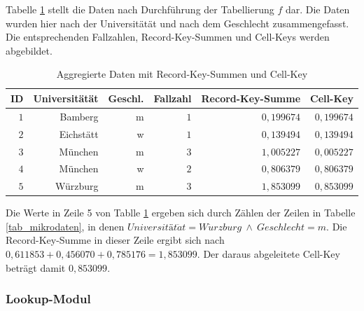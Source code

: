 Tabelle \ref{tab_agg} stellt die Daten nach Durchführung der Tabellierung $f$ dar. Die Daten wurden hier nach der Universitätät und nach dem Geschlecht zusammengefasst. Die entsprechenden Fallzahlen, Record-Key-Summen und Cell-Keys werden abgebildet. 

\begin{table}[h]
    \centering
    \begin{tabular}{ r r r r r r}
        \textbf{ID} \vline & \textbf{Universitätät} & \textbf{Geschl.} & \textbf{Fallzahl} & \textbf{Record-Key-Summe} & \textbf{Cell-Key} \\ 
        \hline
        $1$ \vline & Bamberg & m & $1$ & $0,199674$ & $0,199674$ \\
        $2$ \vline & Eichstätt & w & $1$ & $0,139494$ & $0,139494$ \\
        $3$ \vline & München & m & $3$ & $1,005227$ & $0,005227$ \\
        $4$ \vline & München & w & $2$ & $0,806379$ & $0,806379$ \\
        $5$ \vline & Würzburg & m & $3$ & $1,853099$ & $0,853099$
    \end{tabular}
    \caption{Aggregierte Daten mit Record-Key-Summen und Cell-Key}
    \label{tab_agg}
\end{table}

Die Werte in Zeile 5 von Tablle \ref{tab_agg} ergeben sich durch Zählen der Zeilen in Tabelle \ref{tab_mikrodaten}, in denen $Universität\ddot{a}t = W\ddot{u}rzburg \: \wedge \: Geschlecht = m$. Die Record-Key-Summe in dieser Zeile ergibt sich nach $0,611853 + 0,456070 + 0,785176 = 1,853099$. Der daraus abgeleitete Cell-Key beträgt damit $0,853099$.

\subsubsection{Lookup-Modul}

